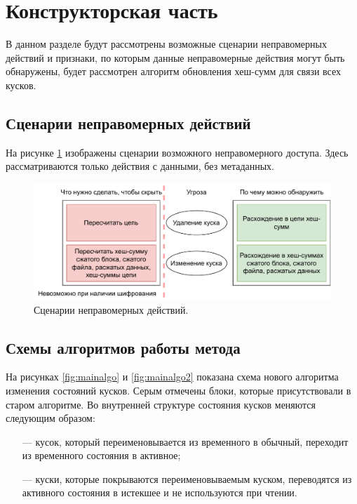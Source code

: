 \section{Конструкторская часть}

В данном разделе будут рассмотрены возможные сценарии неправомерных действий и признаки, по которым данные неправомерные действия могут быть обнаружены, будет рассмотрен алгоритм обновления хеш-сумм для связи всех кусков.

\subsection{Сценарии неправомерных действий}

На рисунке \ref{fig:scenarios} изображены сценарии возможного неправомерного доступа. Здесь рассматриваются только действия с данными, без метаданных.

\begin{figure}[hbtp]
	\centering
	\includegraphics[width=\textwidth]{img/scenarios.pdf}
	\caption{Сценарии неправомерных действий.}
	\label{fig:scenarios}
\end{figure}

\subsection{Схемы алгоритмов работы метода}

На рисунках \ref{fig:mainalgo} и \ref{fig:mainalgo2} показана схема нового алгоритма изменения состояний кусков. Серым отмечены блоки, которые присутствовали в старом алгоритме. Во внутренней структуре состояния кусков меняются следующим образом:
\begin{itemize}
	\item [---] кусок, который переименовывается из временного в обычный, переходит из временного состояния в активное;
	\item [---] куски, которые покрываются переименовываемым куском, переводятся из активного состояния в истекшее и не используются при чтении.
\end{itemize}

